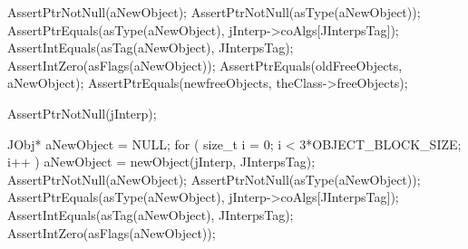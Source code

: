   AssertPtrNotNull(aNewObject);
  AssertPtrNotNull(asType(aNewObject));
  AssertPtrEquals(asType(aNewObject), jInterp->coAlgs[JInterpsTag]);
  AssertIntEquals(asTag(aNewObject), JInterpsTag);
  AssertIntZero(asFlags(aNewObject));
  AssertPtrEquals(oldFreeObjects, aNewObject);
  AssertPtrEquals(newfreeObjects, theClass->freeObjects);
\stopCTest
\stopTestCase


\startCTest
  AssertPtrNotNull(jInterp);

  JObj* aNewObject = NULL;
  for ( size_t i = 0; i < 3*OBJECT_BLOCK_SIZE; i++ ) {
    aNewObject = newObject(jInterp, JInterpsTag);
  }
  AssertPtrNotNull(aNewObject);
  AssertPtrNotNull(asType(aNewObject));
  AssertPtrEquals(asType(aNewObject), jInterp->coAlgs[JInterpsTag]);
  AssertIntEquals(asTag(aNewObject), JInterpsTag);
  AssertIntZero(asFlags(aNewObject));
\stopCTest
\stopTestCase
\stopTestSuite
